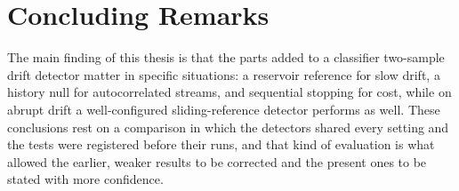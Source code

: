 \section{Concluding Remarks}

The main finding of this thesis is that the parts added to a classifier two-sample drift detector matter in specific situations: a reservoir reference for slow drift, a history null for autocorrelated streams, and sequential stopping for cost, while on abrupt drift a well-configured sliding-reference detector performs as well. These conclusions rest on a comparison in which the detectors shared every setting and the tests were registered before their runs, and that kind of evaluation is what allowed the earlier, weaker results to be corrected and the present ones to be stated with more confidence.
